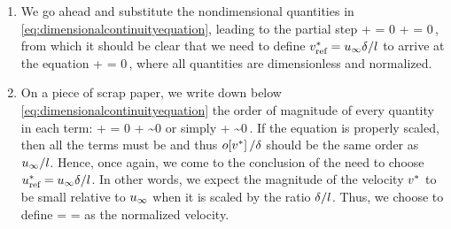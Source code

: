 \begin{enumerate}
\item We go ahead and substitute the nondimensional quantities in \cref{eq:dimensionalcontinuityequation}, leading to the partial step
\beq
\xpd{\left(\ndvelx\fsvel\right)}{\left(\ndposx\length\right)} + 
 = 0\implies
%
\dfrac{\fsvel}{\length}\xpd{\ndvelx}{\ndposx} + 
\xpd{\ndvely}{\ndposy} = 0\,,
\eeq
from which it should be clear that we need to define $v^*_\text{ref} = u_{\infty}\delta/l$ to arrive at the equation
\bneq\label{eq:dimensionlesscontinuityequation}
\ipd\ndposx\ndvelx + \ipd\ndposy\ndvely = 0\,,
\eneq
where all quantities are dimensionless and normalized.
%
\item On a piece of scrap paper, we write down below \cref{eq:dimensionalcontinuityequation} the order of magnitude of every quantity in each term:
\beq
\dfrac{\fsvel}{\length}\xpd{\ndvelx}{\ndposx} + 
\xpd{\ndvely}{\ndposy} = 0\implies
%
\dfrac{\fsvel}{\length} + \dfrac{\lilo\vely}{\blthck}\sim 0
\eeq
or simply
\beq
\dfrac{\fsvel}{\length} + \dfrac{\lilo\vely}{\blthck}\sim 0\,.
\eeq
If the equation is properly scaled, then all the terms must be  and thus $o\!\left[{v^*}\right]/\delta$ should be the same order as $u_{\infty}/l$. Hence, once again, we come to the conclusion of the need to choose $u^*_\text{ref} = u_{\infty}\delta/l$. In other words, we expect the magnitude of the velocity $v^*$ to be small relative to $u_{\infty}$ when it is scaled by the ratio $\delta/l$. Thus, we choose to define
\bneq\label{eq:scalingyvelocity}
\ndvely =  
        = \dfrac{\length}{\blthck}\dfrac{\vely}{\fsvel}
\eneq
as the normalized velocity.
\end{enumerate}

